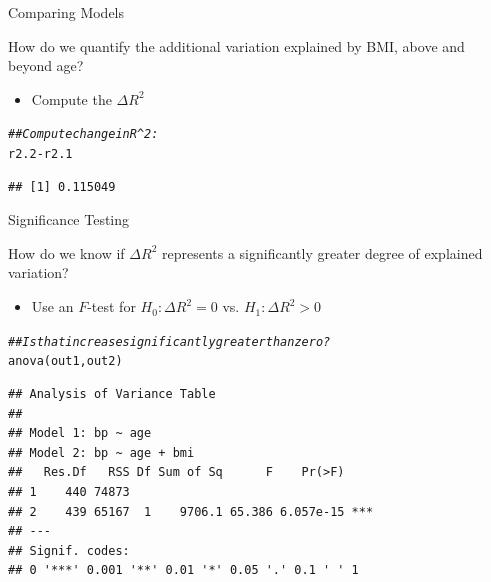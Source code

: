\documentclass[10pt]{beamer}\usepackage[]{graphicx}\usepackage[]{color}
\makeatletter
\newcommand{\hlcom}[1]{\textcolor[rgb]{0.514,0.506,0.514}{\textit{#1}}}%
\newcommand{\hlopt}[1]{\textcolor[rgb]{0,0,0}{#1}}%
\newcommand{\hlstd}[1]{\textcolor[rgb]{0,0,0}{#1}}%
\newcommand{\hlkwd}[1]{\textcolor[rgb]{0.004,0.004,0.506}{#1}}%
\newenvironment{kframe}{%
 \def\at@end@of@kframe{}%
 \ifinner\ifhmode%
  \def\at@end@of@kframe{\end{minipage}}%
  \begin{minipage}{\columnwidth}%
 \fi\fi%
 \def\FrameCommand##1{\hskip\@totalleftmargin \hskip-\fboxsep
 \colorbox{shadecolor}{##1}\hskip-\fboxsep
     \hskip-\linewidth \hskip-\@totalleftmargin \hskip\columnwidth}%
 \MakeFramed {\advance\hsize-\width
   \@totalleftmargin\z@ \linewidth\hsize
   \@setminipage}}%
 {\par\unskip\endMakeFramed%
 \at@end@of@kframe}
\newenvironment{knitrout}{}{} %
\makeatother
\begin{document}

\begin{frame}[fragile]{Comparing Models}

  How do we quantify the additional variation explained by BMI, above and beyond
  age?
  \begin{itemize}
  \item Compute the $\Delta R^2$
  \end{itemize}

\begin{knitrout}\footnotesize
{}\color{fgcolor}\begin{kframe}
\begin{alltt}
\hlcom{## Compute change in R^2:}
\hlstd{r2.2} \hlopt{-} \hlstd{r2.1}
\end{alltt}
\begin{verbatim}
## [1] 0.115049
\end{verbatim}
\end{kframe}
\end{knitrout}

\end{frame}


\begin{frame}[fragile]{Significance Testing}

How do we know if $\Delta R^2$ represents a significantly greater degree of
explained variation?
\begin{itemize}
\item Use an $F$-test for $H_0: \Delta R^2 = 0$ vs. $H_1: \Delta R^2 > 0$
\end{itemize}

\begin{knitrout}\footnotesize
{}\color{fgcolor}\begin{kframe}
\begin{alltt}
\hlcom{## Is that increase significantly greater than zero?}
\hlkwd{anova}\hlstd{(out1, out2)}
\end{alltt}
\begin{verbatim}
## Analysis of Variance Table
## 
## Model 1: bp ~ age
## Model 2: bp ~ age + bmi
##   Res.Df   RSS Df Sum of Sq      F    Pr(>F)    
## 1    440 74873                                  
## 2    439 65167  1    9706.1 65.386 6.057e-15 ***
## ---
## Signif. codes:  
## 0 '***' 0.001 '**' 0.01 '*' 0.05 '.' 0.1 ' ' 1
\end{verbatim}
\end{kframe}
\end{knitrout}

\end{frame}
\end{document}
